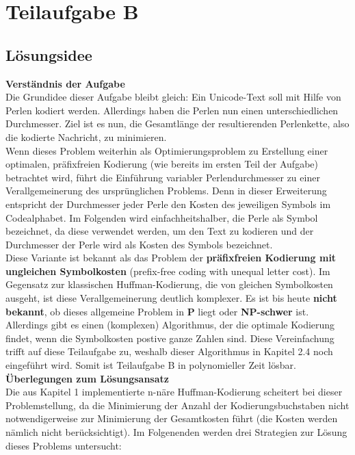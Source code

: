 \documentclass[a4paper,10pt,ngerman]{scrartcl}
\begin{document}
\section{Teilaufgabe B}
\subsection{Lösungsidee}
\textbf{Verständnis der Aufgabe}\\
\newline
Die Grundidee dieser Aufgabe bleibt gleich: Ein Unicode-Text soll mit Hilfe von Perlen kodiert werden. Allerdings haben die Perlen nun einen unterschiedlichen Durchmesser. Ziel ist es nun, die Gesamtlänge der resultierenden Perlenkette, also die kodierte Nachricht, zu minimieren.  \\
Wenn dieses Problem weiterhin als Optimierungsproblem zu Erstellung einer optimalen, präfixfreien Kodierung (wie bereits im ersten Teil der Aufgabe) betrachtet wird, führt die Einführung variabler Perlendurchmesser zu einer Verallgemeinerung des ursprünglichen Problems. Denn in dieser Erweiterung entspricht der Durchmesser jeder Perle den Kosten des jeweiligen Symbols im Codealphabet. Im Folgenden wird einfachheitshalber, die Perle als Symbol bezeichnet, da diese verwendet werden, um den Text zu kodieren und der Durchmesser der Perle wird als Kosten des Symbols bezeichnet. \\
\newline
Diese Variante ist bekannt als das Problem der \textbf{präfixfreien Kodierung mit ungleichen Symbolkosten} (prefix-free coding with unequal letter cost). Im Gegensatz zur klassischen Huffman-Kodierung, die von gleichen Symbolkosten ausgeht, ist diese Verallgemeinerung deutlich komplexer. Es ist bis heute \textbf{nicht bekannt}, ob dieses allgemeine Problem in \textbf{P} liegt oder \textbf{NP-schwer} ist. Allerdings gibt es einen (komplexen) Algorithmus, der die optimale Kodierung findet, wenn die Symbolkosten postive ganze Zahlen sind. Diese Vereinfachung trifft auf diese Teilaufgabe zu, weshalb dieser Algorithmus in Kapitel 2.4 noch eingeführt wird. Somit ist Teilaufgabe B in polynomieller Zeit lösbar.
\\\newline
\textbf{Überlegungen zum Lösungsansatz}\\
\newline
Die aus Kapitel 1 implementierte n-näre Huffman-Kodierung scheitert bei dieser Problemstellung, da die Minimierung der Anzahl der Kodierungsbuchstaben nicht notwendigerweise zur Minimierung der Gesamtkosten führt (die Kosten werden nämlich nicht berücksichtigt).  
\newline
Im Folgenenden werden drei Strategien zur Lösung dieses Problems untersucht: 
\end{document}
